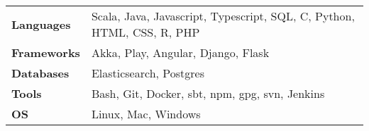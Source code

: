 \documentclass[letterpaper]{article}
\begin{document}
  \noindent
  \begin{tabularx}{\textwidth}{@{}lX@{}}
    \textbf{Languages} & Scala, Java, Javascript, Typescript, SQL, C, Python, HTML, CSS, R, PHP \\
    \textbf{Frameworks} & Akka, Play, Angular, Django, Flask \\
    \textbf{Databases} & Elasticsearch, Postgres \\
    \textbf{Tools} & Bash, Git, Docker, sbt, npm, gpg, svn, Jenkins \\
    \textbf{OS} & Linux, Mac, Windows
  \end{tabularx}
\end{document}
